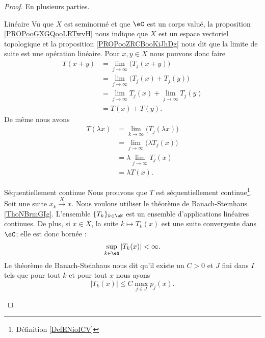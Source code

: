 \begin{proof}
	En plusieurs parties.
	\begin{subproof}
		\item[Linéaire]
		Vu que \( X\) est seminormé et que \( \eC\) est un corps valué, la proposition \ref{PROPooGXGQooLRTwvH} nous indique que \( X\) est un espace vectoriel topologique et la proposition \ref{PROPooZRCBooKiJhDg} nous dit que la limite de suite est une opération linéaire. Pour \( x,y\in X\) nous pouvons donc faire
		\begin{subequations}
			\begin{align}
				T(x+y) & =\lim_{j\to \infty} \big( T_j(x+y) \big)             \\
				       & =\lim_{j\to \infty} \big( T_j(x)+T_j(y) \big)        \\
				       & =\lim_{j\to \infty} T_j(x)+\lim_{j\to \infty} T_j(y) \\
				       & =T(x)+T(y).
			\end{align}
		\end{subequations}
		De même nous avons
		\begin{subequations}
			\begin{align}
				T(\lambda x) & =\lim_{k\to \infty} \big( T_j(\lambda x) \big) \\
				             & =\lim_{j\to \infty} \big( \lambda T_j(x) \big) \\
				             & =\lambda\lim_{j\to \infty} T_j(x)              \\
				             & =\lambda T(x).
			\end{align}
		\end{subequations}
		\item[Séquentiellement continue]
		Nous prouvons que \( T\) est séquentiellement continue\footnote{Définition \ref{DefENioICV}}. Soit une suite \( x_k\stackrel{X}{\longrightarrow}x\). Nous voulons utiliser le théorème de Banach-Steinhaus \ref{ThoNBrmGIg}. L'ensemble \( \{ T_k \}_{k\in \eN}\) est un ensemble d'applications linéaires continues. De plus, si \( x\in X\), la suite \( k\mapsto T_k(x)\) est une suite convergente dans \( \eC\); elle est donc bornée :
		\begin{equation}
			\sup_{k\in \eN}| T_k(x) |<\infty.
		\end{equation}
		Le théorème de Banach-Steinhaus nous dit qu'il existe un \( C>0\) et \( J\) fini dans \( I\) tels que pour tout \( k\) et pour tout \( x\) nous ayons
		\begin{equation}
			| T_k(x) |\leq C\max_{j\in J} p_j(x).

\end{equation}
\end{subproof}
\end{proof}
